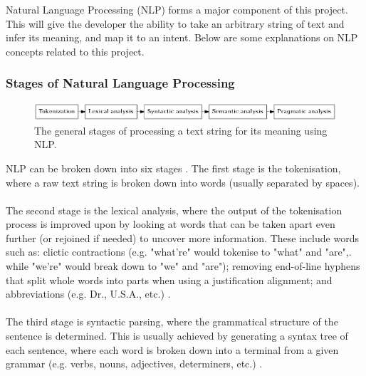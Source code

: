 \documentclass[12pt]{article}
\begin{document}
Natural Language Processing (NLP) forms a major component of this project. This will give the developer the ability to take an arbitrary string of text and infer its meaning, and map it to an intent. Below are some explanations on NLP concepts related to this project.

\subsubsection{Stages of Natural Language Processing}

\begin{center}
\begin{figure}[H]
  \includegraphics[width=\textwidth]{nlp-stages.png}
  \caption{The general stages of processing a text string for its meaning using NLP.}
\end{figure}
\end{center}

NLP can be broken down into six stages \cite{RefWorks:38}. The first stage is the tokenisation, where a raw text string is broken down into words (usually separated by spaces).
\\
\\
The second stage is the lexical analysis, where the output of the tokenisation process is improved upon by looking at words that can be taken apart even further (or rejoined if needed) to uncover more information. These include words such as: clictic contractions (e.g. "what're" would tokenise to "what" and "are",. while "we're" would break down to "we" and "are"); removing end-of-line hyphens that split whole words into parts when using a justification alignment; and abbreviations (e.g. Dr., U.S.A., etc.) \cite{RefWorks:39}.
\\
\\
The third stage is syntactic parsing, where the grammatical structure of the sentence is determined. This is usually achieved by generating a syntax tree of each sentence, where each word is broken down into a terminal from a given grammar (e.g. verbs, nouns, adjectives, determiners, etc.) \cite{RefWorks:40}.
\end{document}
